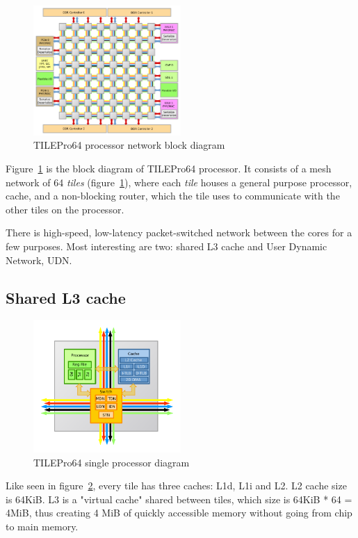 \documentclass[english,11pt]{article}
\begin{document}
\begin{figure}
    \centering
    \includegraphics[width=0.5\textwidth]{tile64.pdf}
    \caption{TILEPro64 processor network block diagram}
    \label{fig:tile64}
\end{figure}

Figure~\ref{fig:tile64} is the block diagram of TILEPro64 processor. It consists
of a mesh network of 64 {\em tiles} (figure~\ref{fig:tile64}), where each {\em
tile} houses a general purpose processor, cache, and a non-blocking router,
which the tile uses to communicate with the other tiles on the processor.

There is high-speed, low-latency packet-switched network between the cores for a
few purposes. Most interesting are two: shared L3 cache and User Dynamic
Network, UDN.

\subsection{Shared L3 cache}

\begin{figure}
    \centering
    \includegraphics[width=0.5\textwidth]{tile64_cpu.pdf}
    \caption{TILEPro64 single processor diagram}
    \label{fig:tile64_cpu}
\end{figure}

Like seen in figure~\ref{fig:tile64_cpu}, every tile has three caches: L1d, L1i
and L2. L2 cache size is 64KiB. L3 is a "virtual cache" shared between tiles,
which size is 64KiB * 64 = 4MiB, thus creating 4 MiB of quickly accessible
memory without going from chip to main memory.
\end{document}
